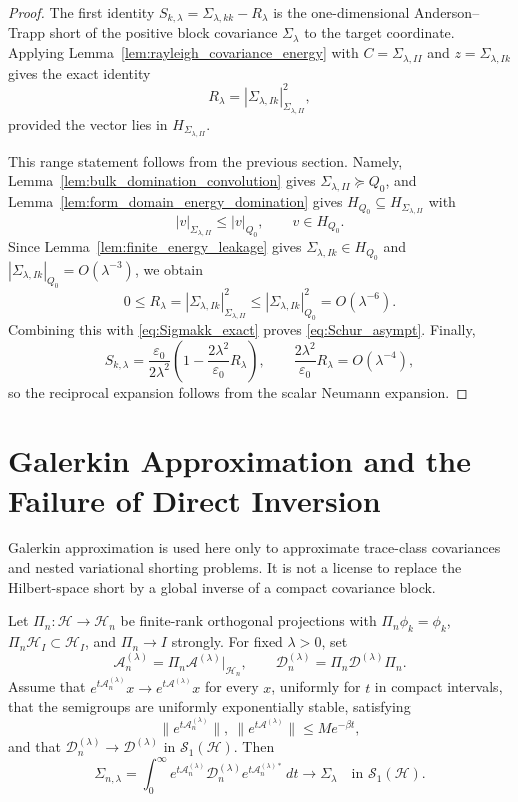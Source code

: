 \begin{proof}
The first identity $S_{k,\lambda}=\Sigma_{\lambda,kk}-R_\lambda$ is the
one-dimensional Anderson--Trapp short of the positive block covariance
$\Sigma_\lambda$ to the target coordinate.  Applying
Lemma~\ref{lem:rayleigh_covariance_energy} with
$C=\Sigma_{\lambda,II}$ and $z=\Sigma_{\lambda,Ik}$ gives the exact identity
\[
  R_\lambda=|\Sigma_{\lambda,Ik}|_{\Sigma_{\lambda,II}}^2,
\]
provided the vector lies in $H_{\Sigma_{\lambda,II}}$.

This range statement follows from the previous section.  Namely,
Lemma~\ref{lem:bulk_domination_convolution} gives
$\Sigma_{\lambda,II}\succeq Q_0$, and
Lemma~\ref{lem:form_domain_energy_domination} gives
$H_{Q_0}\subseteq H_{\Sigma_{\lambda,II}}$ with
\[
  |v|_{\Sigma_{\lambda,II}}\le |v|_{Q_0},
  \qquad v\in H_{Q_0}.
\]
Since Lemma~\ref{lem:finite_energy_leakage} gives
$\Sigma_{\lambda,Ik}\in H_{Q_0}$ and
$|\Sigma_{\lambda,Ik}|_{Q_0}=O(\lambda^{-3})$, we obtain
\[
  0\le R_\lambda
  =|\Sigma_{\lambda,Ik}|_{\Sigma_{\lambda,II}}^2
  \le |\Sigma_{\lambda,Ik}|_{Q_0}^2
  =O(\lambda^{-6}).
\]
Combining this with \eqref{eq:Sigmakk_exact} proves
\eqref{eq:Schur_asympt}.  Finally,
\[
  S_{k,\lambda}
  =\frac{\varepsilon_0}{2\lambda^2}
   \left(1-\frac{2\lambda^2}{\varepsilon_0}R_\lambda\right),
  \qquad
  \frac{2\lambda^2}{\varepsilon_0}R_\lambda=O(\lambda^{-4}),
\]
so the reciprocal expansion follows from the scalar Neumann expansion.
\end{proof}

\section{Galerkin Approximation and the Failure of Direct Inversion}
\label{app:galerkin_shorting}

Galerkin approximation is used here only to approximate trace-class covariances
and nested variational shorting problems.  It is not a license to replace the
Hilbert-space short by a global inverse of a compact covariance block.

\begin{lemma}
\label{lem:galerkin_trace_norm}
Let $\Pi_n:\mathcal{H}\to\mathcal{H}_n$ be finite-rank orthogonal projections
with $\Pi_n\phi_k=\phi_k$, $\Pi_n\mathcal{H}_I\subset\mathcal{H}_I$, and
$\Pi_n\to I$ strongly.  For fixed $\lambda>0$, set
\[
  \mathcal{A}_n^{(\lambda)}
  =\Pi_n\mathcal{A}^{(\lambda)}|_{\mathcal{H}_n},
  \qquad
  \mathcal{D}_n^{(\lambda)}
  =\Pi_n\mathcal{D}^{(\lambda)}\Pi_n .
\]
Assume that $e^{t\mathcal{A}_n^{(\lambda)}}x\to
e^{t\mathcal{A}^{(\lambda)}}x$ for every $x$, uniformly for $t$ in compact
intervals, that the semigroups are uniformly exponentially stable, satisfying
\[
  \|e^{t\mathcal{A}_n^{(\lambda)}}\|,\
  \|e^{t\mathcal{A}^{(\lambda)}}\|\le Me^{-\beta t},
\]
and that $\mathcal{D}_n^{(\lambda)}\to\mathcal{D}^{(\lambda)}$ in
$\mathcal{S}_1(\mathcal{H})$.  Then
\[
  \Sigma_{n,\lambda}
  =
  \int_0^\infty
  e^{t\mathcal{A}_n^{(\lambda)}}
  \mathcal{D}_n^{(\lambda)}
  e^{t\mathcal{A}_n^{(\lambda)*}}\,dt
  \longrightarrow
  \Sigma_\lambda
  \quad\text{in }\mathcal{S}_1(\mathcal{H}).
\]
\end{lemma}

